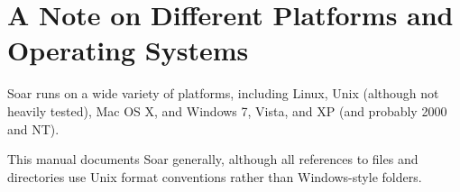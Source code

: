 \section{A Note on Different Platforms and Operating Systems}
\label{INTRO-platforms}

Soar runs on a wide variety of platforms, including Linux, Unix
(although not heavily tested), Mac OS X, and Windows 7, Vista, and XP
(and probably 2000 and NT).

This manual documents Soar generally, although all references to files
and directories use Unix format conventions rather than Windows-style folders.

